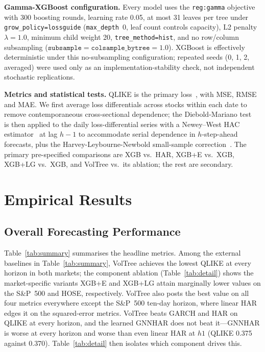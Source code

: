 \documentclass[runningheads,a4paper]{llncs}
\begin{document}
\textbf{Gamma-XGBoost configuration.} Every model uses the \texttt{reg:gamma} objective with 300 boosting
rounds, learning rate 0.05, at most 31 leaves per tree under \texttt{grow\_policy=lossguide}
(\texttt{max\_depth}~0, leaf count controls capacity), L2 penalty $\lambda=1.0$, minimum child weight 20,
\texttt{tree\_method=hist}, and no row/column subsampling
($\texttt{subsample}=\texttt{colsample\_bytree}=1.0$). XGBoost is effectively deterministic under this
no-subsampling configuration; repeated seeds (0, 1, 2, averaged) were used only as an implementation-stability
check, not independent stochastic replications.

\textbf{Metrics and statistical tests.} QLIKE is the primary loss~\cite{patton2011}, with MSE, RMSE and
MAE. We first average loss differentials across stocks within each date to remove contemporaneous
cross-sectional dependence; the Diebold-Mariano test~\cite{dm1995} is then applied to the daily
loss-differential series with a Newey--West HAC estimator~\cite{neweywest1987} at lag $h-1$ to accommodate
serial dependence in $h$-step-ahead forecasts, plus the Harvey-Leybourne-Newbold small-sample
correction~\cite{hln1997}. The primary pre-specified comparisons are XGB vs.\ HAR, XGB+E vs.\ XGB, XGB+LG
vs.\ XGB, and VolTree vs.\ its ablation; the rest are secondary.


\section{Empirical Results}

\subsection{Overall Forecasting Performance}
Table~\ref{tab:summary} summarises the headline metrics. Among the external baselines in
Table~\ref{tab:summary}, VolTree achieves the lowest QLIKE at every horizon in both markets; the component
ablation (Table~\ref{tab:detail}) shows the market-specific variants XGB+E and XGB+LG attain marginally
lower values on the S\&P~500 and HOSE, respectively. VolTree also posts the best value on all four metrics
everywhere except the S\&P~500 ten-day horizon, where linear HAR edges it on the squared-error metrics.
VolTree beats GARCH and HAR on QLIKE at every horizon, and the learned GNNHAR does not beat
it---GNNHAR is worse at every horizon and worse than even linear HAR at $h1$ (QLIKE 0.375 against 0.370).
Table~\ref{tab:detail} then isolates which component drives this.
\end{document}
